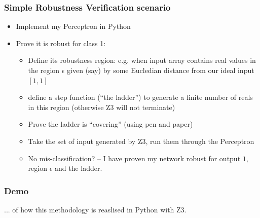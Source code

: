 \documentclass{beamer}
\begin{document}
	\begin{frame}[fragile]
      \frametitle{Simple Robustness Verification scenario}
      \begin{itemize}
      \item Implement my Perceptron in Python \pause
      \item Prove it is robust for class 1: \pause
        \begin{itemize}
      \item Define its robustness region: e.g. when input array contains real values in 
        the region $\epsilon$ given (say) by some Eucledian distance  from our ideal input $[1,1]$ \pause
      \item define a step function (``the ladder'') to generate a finite number of reals in this region (otherwise Z3 will not terminate) \pause
      \item Prove the ladder is ``covering'' (using pen and paper) \pause
      \item  Take the set of input generated by Z3, run them through the Perceptron \pause
        \item No mis-classification? -- I have proven my network robust for output $1$, region $\epsilon$ and the ladder.
\end{itemize}
\end{itemize}




      \end{frame}
	

      \begin{frame}
        \frametitle{Demo}
        ... of how this methodology is reaslised in Python with Z3.
        \end{frame}
      
\end{document}
